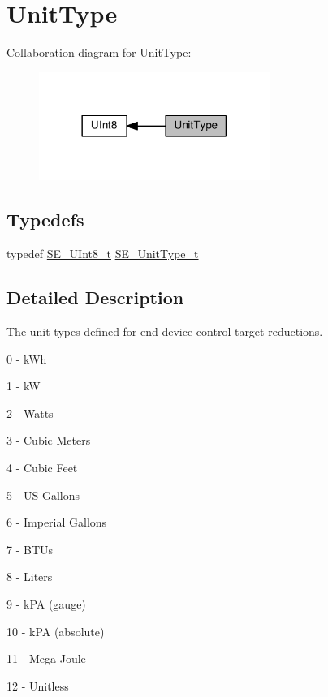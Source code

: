 \hypertarget{group__UnitType}{}\section{Unit\+Type}
\label{group__UnitType}
Collaboration diagram for Unit\+Type\+:\nopagebreak
\begin{figure}[H]
\begin{center}
\leavevmode
\includegraphics[width=213pt]{group__UnitType}
\end{center}
\end{figure}
\subsection*{Typedefs}
\begin{DoxyCompactItemize}
\item 
typedef \hyperlink{group__UInt8_gaf7c365a1acfe204e3a67c16ed44572f5}{S\+E\+\_\+\+U\+Int8\+\_\+t} \hyperlink{group__UnitType_ga402dc1288733e4df30c6ae69e947cebe}{S\+E\+\_\+\+Unit\+Type\+\_\+t}
\end{DoxyCompactItemize}


\subsection{Detailed Description}
The unit types defined for end device control target reductions.

0 -\/ k\+Wh

1 -\/ kW

2 -\/ Watts

3 -\/ Cubic Meters

4 -\/ Cubic Feet

5 -\/ US Gallons

6 -\/ Imperial Gallons

7 -\/ B\+T\+Us

8 -\/ Liters

9 -\/ k\+PA (gauge)

10 -\/ k\+PA (absolute)

11 -\/ Mega Joule

12 -\/ Unitless

